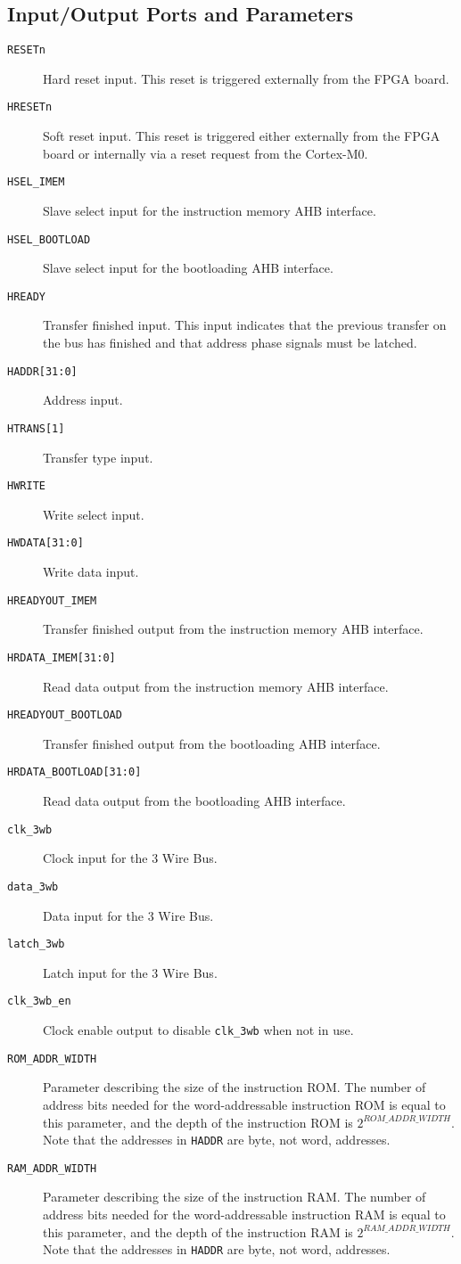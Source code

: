 \subsection{Input/Output Ports and Parameters}
\begin{description}
	\item[\texttt{RESETn}] Hard reset input. This reset is triggered externally from the FPGA board.
	\item[\texttt{HRESETn}] Soft reset input. This reset is triggered either externally from the FPGA board or internally via a reset request from the Cortex-M0.
	\item[\texttt{HSEL\_IMEM}] Slave select input for the instruction memory AHB interface.
	\item[\texttt{HSEL\_BOOTLOAD}] Slave select input for the bootloading AHB interface.
	\item[\texttt{HREADY}] Transfer finished input. This input indicates that the previous transfer on the bus has finished and that address phase signals must be latched.
	\item[\texttt{HADDR[31:0]}] Address input.
	\item[\texttt{HTRANS[1]}] Transfer type input.
	\item[\texttt{HWRITE}] Write select input.
	\item[\texttt{HWDATA[31:0]}] Write data input.
	\item[\texttt{HREADYOUT\_IMEM}] Transfer finished output from the instruction memory AHB interface.
	\item[\texttt{HRDATA\_IMEM[31:0]}] Read data output from the instruction memory AHB interface.\item[\texttt{HREADYOUT\_BOOTLOAD}] Transfer finished output from the bootloading AHB interface.
	\item[\texttt{HRDATA\_BOOTLOAD[31:0]}] Read data output from the bootloading AHB interface.
	\item[\texttt{clk\_3wb}] Clock input for the 3 Wire Bus.
	\item[\texttt{data\_3wb}] Data input for the 3 Wire Bus.
	\item[\texttt{latch\_3wb}] Latch input for the 3 Wire Bus.
	\item[\texttt{clk\_3wb\_en}] Clock enable output to disable \texttt{clk\_3wb} when not in use.
	\item[\texttt{ROM\_ADDR\_WIDTH}] Parameter describing the size of the instruction ROM. The number of address bits needed for the word-addressable instruction ROM is equal to this parameter, and the depth of the instruction ROM is $2^{ROM\_ADDR\_WIDTH}$. Note that the addresses in \texttt{HADDR} are byte, not word, addresses.
	\item[\texttt{RAM\_ADDR\_WIDTH}] Parameter describing the size of the instruction RAM. The number of address bits needed for the word-addressable instruction RAM is equal to this parameter, and the depth of the instruction RAM is $2^{RAM\_ADDR\_WIDTH}$. Note that the addresses in \texttt{HADDR} are byte, not word, addresses.
\end{description}

